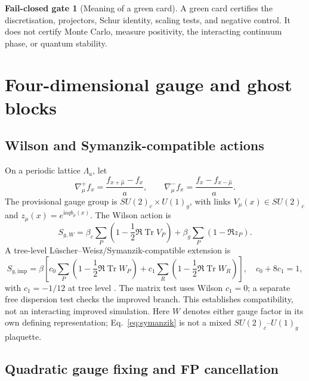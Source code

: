\documentclass[11pt]{article}
\theoremstyle{definition}
\newtheorem{gate}[proposition]{Fail-closed gate}
\theoremstyle{remark}
\newcommand{\ii}{\mathrm i}
\newcommand{\Tr}{\operatorname{Tr}}
\begin{document}
\begin{gate}[Meaning of a green card]
A green card certifies the discretisation, projectors, Schur identity,
scaling tests, and negative control.  It does not certify Monte Carlo,
measure positivity, the interacting continuum phase, or quantum stability.
\end{gate}

\section{Four-dimensional gauge and ghost blocks}

\subsection{Wilson and Symanzik-compatible actions}

On a periodic lattice \(\Lambda_a\), let
\[
 \nabla_\mu^+f_x=\frac{f_{x+\hat\mu}-f_x}{a},\qquad
 \nabla_\mu^-f_x=\frac{f_x-f_{x-\hat\mu}}{a}.
\]
The provisional gauge group is \(SU(2)_c\times U(1)_g\), with links
\(V_\mu(x)\in SU(2)_c\) and \(z_\mu(x)=e^{\ii aqb_\mu(x)}\).  The Wilson
action is \cite{Wilson1974}
\begin{equation}
 S_{g,W}=\beta_c\sum_P\left(1-\frac12\Re\Tr V_P\right)
 +\beta_g\sum_P(1-\Re z_P).
 \label{eq:wilson}
\end{equation}
A tree-level L\"uscher--Weisz/Symanzik-compatible extension is
\begin{equation}
 S_{g,\mathrm{imp}}=\beta\left[
 c_0\sum_P\left(1-\frac12\Re\Tr W_P\right)
 +c_1\sum_R\left(1-\frac12\Re\Tr W_R\right)\right],
 \quad c_0+8c_1=1,
 \label{eq:symanzik}
\end{equation}
with \(c_1=-1/12\) at tree level
\cite{Symanzik1983I,LuscherWeisz1985}.  The matrix test uses Wilson
\(c_1=0\); a separate free dispersion test checks the improved branch.
This establishes compatibility, not an interacting improved simulation.
Here \(W\) denotes either gauge factor in its own defining representation;
Eq.~\eqref{eq:symanzik} is not a mixed \(SU(2)_c\)--\(U(1)_g\) plaquette.

\subsection{Quadratic gauge fixing and FP cancellation}
\end{document}
